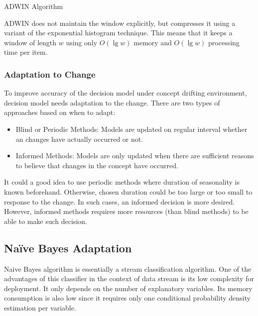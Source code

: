 \documentclass[a4paper, 11pt, oneside]{book}
\begin{document}
\begin{algorithm}[htbp]
    \DontPrintSemicolon
\label{alg:adwin}
\caption{ADWIN Algorithm}

\end{algorithm}

ADWIN does not maintain the window explicitly, but compresses it using a variant of the exponential histogram technique. This means that it keeps a window of length $w$ using only $O(\lg w)$ memory and $O(\lg w)$ processing time per item.

\subsubsection{Adaptation to Change}
To improve accuracy of the decision model under concept drifting environment, decision model needs adaptation to the change. There are two types of approaches based on when to adapt: 
\begin{itemize}    
    \item Blind or Periodic Methods: Models are updated on regular interval whether an changes have actually occurred or not. 
    \item Informed Methods: Models are only updated when there are sufficient reasons to believe that changes in the concept have occurred.
\end{itemize}
It could a good idea to use periodic methods where duration of seasonality is known beforehand. Otherwise, chosen duration could be too large or too small to response to the change. In such cases, an informed decision is more desired. However, informed methods requires more resources (than blind methods) to be able to make such decision.


\subsection{Na\"ive Bayes Adaptation}
Naive Bayes algorithm is essentially a stream classification algorithm. One of the advantages of this classifier in the context of data stream is its low complexity for deployment. It only depends on the number of explanatory variables. Its memory consumption is also low since it requires only one conditional probability density estimation per variable.
\end{document}
